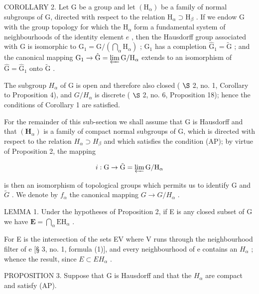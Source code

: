 COROLLARY 2. Let G be a group and let \((\mathrm{H}_{\alpha})\) be a family of normal subgroups of G, directed with respect to the relation \(\mathrm{H}_{\alpha} \supset \mathrm{H}_{\beta}\) . If we endow G with the group topology for which the \(\mathrm{H}_{\alpha}\) form a fundamental system of neighbourhoods of the identity element \(e\) , then the Hausdorff group associated with G is isomorphic to \(\mathrm{G}_{1} = \mathrm{G} / \left( \bigcap_{\alpha} \mathrm{H}_{\alpha} \right)\) ; \(\mathrm{G}_{1}\) has a completion \(\hat{\mathrm{G}}_{1} = \tilde{\mathrm{G}}\) ; and the canonical mapping \(\mathrm{G}_{1} \to \hat{\mathrm{G}} = \varprojlim \mathrm{G} / \mathrm{H}_{\alpha}\) extends to an isomorphism of \(\hat{\mathrm{G}} = \hat{\mathrm{G}}_{1}\) onto \(\tilde{\mathrm{G}}\) .

The subgroup \(H_{\alpha}\) of G is open and therefore also closed ( \(\S\) 2, no. 1, Corollary to Proposition 4), and \(G/H_{\alpha}\) is discrete ( \(\S\) 2, no. 6, Proposition 18); hence the conditions of Corollary 1 are satisfied.

For the remainder of this sub-section we shall assume that G is Hausdorff and that \((\mathbf{H}_{\alpha})\) is a family of compact normal subgroups of G, which is directed with respect to the relation \(H_{\alpha} \supset H_{\beta}\) and which satisfies the condition (AP); by virtue of Proposition 2, the mapping

\[
i: \mathrm{G} \rightarrow \tilde {\mathrm{G}} = \varprojlim \mathrm{G} / \mathrm{H} _ {\alpha}
\]

is then an isomorphism of topological groups which permits us to identify G and \(\tilde{G}\) . We denote by \(f_{\alpha}\) the canonical mapping \(G \rightarrow G/H_{\alpha}\) .

LEMMA 1. Under the hypotheses of Proposition 2, if E is any closed subset of G we have \(\mathbf{E} = \bigcap_{\alpha} \mathrm{EH}_{\alpha}\) .

For E is the intersection of the sets EV where V runs through the neighbourhood filter of e {[}§ 3, no. 1, formula (1){]}, and every neighbourhood of e contains an \(H_{\alpha}\) ; whence the result, since \(E \subset EH_{\alpha}\) .

PROPOSITION 3. Suppose that G is Hausdorff and that the \(H_{\alpha}\) are compact and satisfy (AP).

